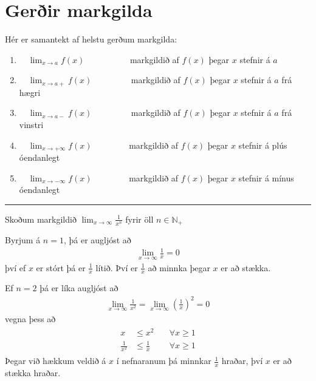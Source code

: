 \documentclass[a4paper,10pt,icelandic]{sphinxmanual}
\begin{document}
\section{Gerðir markgilda}
\label{\detokenize{Kafli10:gerir-markgilda}}
Hér er samantekt af helstu gerðum markgilda:
\begin{enumerate}
%
\item {} 
\(\quad \lim_{x \to a} f(x) \qquad \qquad \quad\) markgildið af \(f(x)\) þegar \(x\)  stefnir á  \(a\)

\item {} 
\(\quad \lim_{x \to a+} f(x) \qquad\qquad\;\) markgildið af \(f(x)\) þegar \(x\)  stefnir á \(a\) frá hægri

\item {} 
\(\quad \lim_{x \to a-} f(x) \qquad \qquad \;\) markgildið af \(f(x)\) þegar \(x\) stefnir á \(a\) frá vinstri

\item {} 
\(\quad \lim_{x\to +\infty} f(x) \qquad \qquad\) markgildið af \(f(x)\) þegar \(x\)  stefnir á plús óendanlegt

\item {} 
\(\quad \lim_{x\to -\infty} f(x) \qquad \qquad\) markgildið af \(f(x)\) þegar \(x\) stefnir á mínus óendanlegt

\end{enumerate}


\bigskip\hrule\bigskip


Skoðum markgildið \(\lim_{x \to \infty}\frac{1}{x^n}\) fyrir öll \(n \in \mathbb{N}_+\)

Byrjum á \(n=1\), þá er augljóst að
\begin{equation*}
\begin{split}\lim_{x \to \infty}\frac{1}{x} = 0\end{split}
\end{equation*}
því ef \(x\) er stórt þá er \(\frac{1}{x}\) lítið.
Því er \(\frac{1}{x}\) að minnka þegar \(x\) er að stækka.

Ef \(n=2\) þá er líka augljóst að
\begin{equation*}
\begin{split}\lim_{x \to \infty}\frac{1}{x^2} = \lim_{x \to \infty}\left(\frac{1}{x}\right)^2 = 0\end{split}
\end{equation*}
vegna þess að
\begin{equation*}
\begin{split}\begin{aligned}
x&\leq x^2 \quad & \forall x \geq 1\\
\frac{1}{x^2} &\leq \frac{1}{x} \quad &\forall x \geq 1 \end{aligned}\end{split}
\end{equation*}
Þegar við hækkum veldið á \(x\) í nefnaranum þá minnkar \(\frac{1}{x}\) hraðar, því \(x\) er að stækka hraðar.
\end{document}
